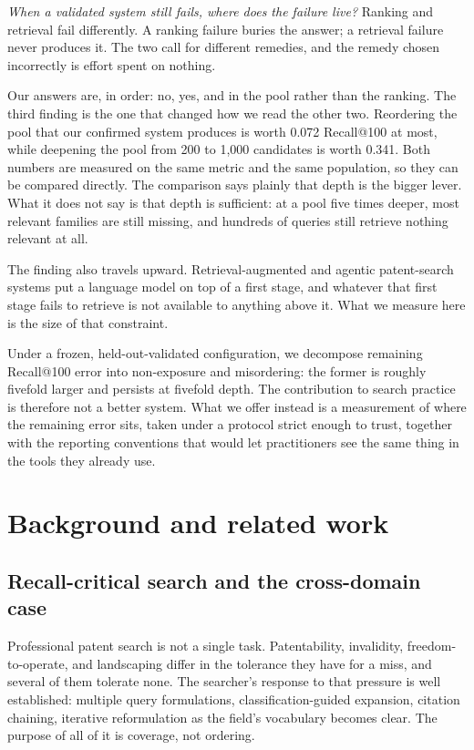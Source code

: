\documentclass[preprint,11pt,authoryear]{elsarticle}          %
\begin{document}
\emph{When a validated system still fails, where does the failure live?} Ranking and retrieval fail differently. A ranking failure buries the answer; a retrieval failure never produces it. The two call for different remedies, and the remedy chosen incorrectly is effort spent on nothing.

Our answers are, in order: no, yes, and in the pool rather than the ranking. The third finding is the one that changed how we read the other two. Reordering the pool that our confirmed system produces is worth 0.072 Recall@100 at most, while deepening the pool from 200 to 1{,}000 candidates is worth 0.341. Both numbers are measured on the same metric and the same population, so they can be compared directly. The comparison says plainly that depth is the bigger lever. What it does not say is that depth is sufficient: at a pool five times deeper, most relevant families are still missing, and hundreds of queries still retrieve nothing relevant at all.

The finding also travels upward. Retrieval-augmented and agentic patent-search systems put a language model on top of a first stage, and whatever that first stage fails to retrieve is not available to anything above it. What we measure here is the size of that constraint.

Under a frozen, held-out-validated configuration, we decompose remaining Recall@100 error into non-exposure and misordering: the former is roughly fivefold larger and persists at fivefold depth. The contribution to search practice is therefore not a better system. What we offer instead is a measurement of where the remaining error sits, taken
under a protocol strict enough to trust, together with the reporting conventions
that would let practitioners see the same thing in the tools they already use.

\section{Background and related work}
\label{sec:related}

\subsection{Recall-critical search and the cross-domain case}

Professional patent search is not a single task. Patentability, invalidity, freedom-to-operate, and landscaping differ in the tolerance they have for a miss, and several of them tolerate none. The searcher's response to that pressure is well established: multiple query formulations, classification-guided expansion, citation chaining, iterative reformulation as the field's vocabulary becomes clear. The purpose of all of it is coverage, not ordering.
\end{document}
